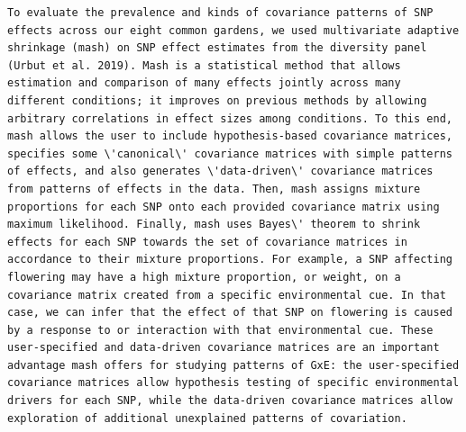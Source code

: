 \documentclass[
  letterpaper,
  DIV=11,
  numbers=noendperiod]{scrartcl}
\begin{document}
\begin{verbatim}
To evaluate the prevalence and kinds of covariance patterns of SNP effects across our eight common gardens, we used multivariate adaptive shrinkage (mash) on SNP effect estimates from the diversity panel (Urbut et al. 2019). Mash is a statistical method that allows estimation and comparison of many effects jointly across many different conditions; it improves on previous methods by allowing arbitrary correlations in effect sizes among conditions. To this end, mash allows the user to include hypothesis-based covariance matrices, specifies some \'canonical\' covariance matrices with simple patterns of effects, and also generates \'data-driven\' covariance matrices from patterns of effects in the data. Then, mash assigns mixture proportions for each SNP onto each provided covariance matrix using maximum likelihood. Finally, mash uses Bayes\' theorem to shrink effects for each SNP towards the set of covariance matrices in accordance to their mixture proportions. For example, a SNP affecting flowering may have a high mixture proportion, or weight, on a covariance matrix created from a specific environmental cue. In that case, we can infer that the effect of that SNP on flowering is caused by a response to or interaction with that environmental cue. These user-specified and data-driven covariance matrices are an important advantage mash offers for studying patterns of GxE: the user-specified covariance matrices allow hypothesis testing of specific environmental drivers for each SNP, while the data-driven covariance matrices allow exploration of additional unexplained patterns of covariation. 


\end{verbatim}
\end{document}
